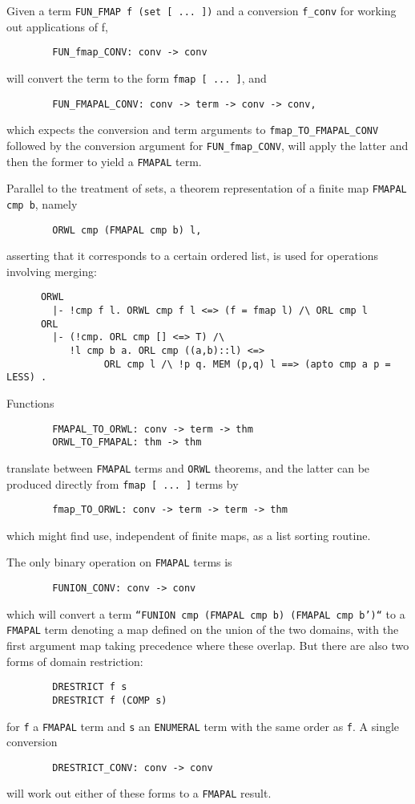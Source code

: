 Given a term {\tt FUN_FMAP f (set [ ...\ ])} and a conversion {\tt f_conv} for
working out applications of f,
\begin{verbatim}
        FUN_fmap_CONV: conv -> conv
\end{verbatim}
will convert the term to the form {\tt fmap [ ...\ ]}, and
\begin{verbatim}
        FUN_FMAPAL_CONV: conv -> term -> conv -> conv,
\end{verbatim}
which expects the conversion and term arguments to {\tt fmap_TO_FMAPAL_CONV}
followed by the conversion argument for {\tt FUN_fmap_CONV}, will apply the
latter and then the former to yield a {\tt FMAPAL} term.

Parallel to the treatment of sets, a theorem representation of a finite
map {\tt FMAPAL cmp b}, namely
\begin{verbatim}
        ORWL cmp (FMAPAL cmp b) l,
\end{verbatim}
asserting that it corresponds to a certain ordered list, is used for
operations involving merging:
\begin{verbatim}
      ORWL
        |- !cmp f l. ORWL cmp f l <=> (f = fmap l) /\ ORL cmp l
      ORL
        |- (!cmp. ORL cmp [] <=> T) /\
           !l cmp b a. ORL cmp ((a,b)::l) <=>
                 ORL cmp l /\ !p q. MEM (p,q) l ==> (apto cmp a p = LESS) .
\end{verbatim}
Functions
\begin{verbatim}
        FMAPAL_TO_ORWL: conv -> term -> thm
        ORWL_TO_FMAPAL: thm -> thm
\end{verbatim}
translate between {\tt FMAPAL} terms and {\tt ORWL} theorems, and the
latter can be produced directly from {\tt fmap [ ...\ ]} terms by
\begin{verbatim}
        fmap_TO_ORWL: conv -> term -> term -> thm
\end{verbatim}
which might find use, independent of finite maps, as a list sorting routine.

The only binary operation on {\tt FMAPAL} terms is
\begin{verbatim}
        FUNION_CONV: conv -> conv
\end{verbatim}
which will convert a term {\tt``FUNION cmp (FMAPAL cmp b) (FMAPAL cmp b')``}
to a {\tt FMAPAL} term denoting a map defined on the union of the two
domains, with the first argument map taking precedence where these overlap.
But there are also two forms of domain restriction:
\begin{verbatim}
        DRESTRICT f s
        DRESTRICT f (COMP s)
\end{verbatim}
for {\tt f} a {\tt FMAPAL} term and {\tt s} an {\tt ENUMERAL} term with
the same order as {\tt f}. A single conversion
\begin{verbatim}
        DRESTRICT_CONV: conv -> conv
\end{verbatim}
will work out either of these forms to a {\tt FMAPAL} result.

